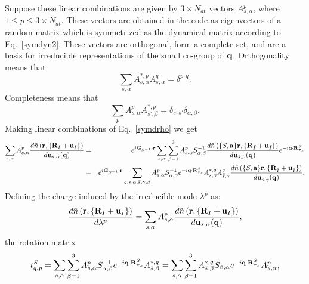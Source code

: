 \documentclass[12pt,a4paper,twoside]{report}
\begin{document}
Suppose these linear combinations are given by $3\times N_{at}$ vectors $A^{p}_{s,\alpha}$, where
$1\le p \le 3 \times N_{at}$. These vectors are obtained in the code as eigenvectors of a random matrix which is symmetrized as the dynamical matrix according to Eq.~\ref{symdyn2}. These vectors are orthogonal, form a complete set, and are a basis for irreducible representations of the small co-group of ${\bf q}$.
Orthogonality means that
\begin{equation}
\sum_{s,\alpha} A^{*,p}_{s,\alpha} A^{q}_{s,\alpha}=\delta^{p,q}.
\end{equation}
Completeness means that
\begin{equation}
\sum_{p} A^{p}_{s,\alpha} A^{*,p}_{s',\beta}=\delta_{s,s'} \delta_{\alpha,\beta}.
\end{equation}
Making linear combinations of Eq.~\ref{symdrho}
we get
\begin{eqnarray}
\sum_{s,\alpha} A^p_{s,\alpha} {d \tilde n\left({\bf r}, \{{\bf R}_I + {\bf u}_I\}\right)
\over d {\bf u}_{s,\alpha}({\bf q})} 
&=& e^{i{\bf G}_{S^{-1}} \cdot {\bf r}}
\sum_{s,\alpha}
\sum_{\beta=1}^3 A^p_{s,\alpha} S^{-1}_{\alpha,\beta} {d \tilde n\left(\{S,{\bf a}\} {\bf r}, \{{\bf R}_{\bar I} + {\bf u}_{\bar I}\}\right)
\over d {\bf u}_{\bar s,\beta} ({\bf q})} e^{-i{\bf q}\cdot {\bf R}^S_{{\boldsymbol{\tau}_s}}}\nonumber \\
&=& e^{i{\bf G}_{S^{-1}} \cdot {\bf r}}
\sum_{q,s,\alpha, \bar{\bar s},\gamma,\beta} A^p_{s,\alpha} S^{-1}_{\alpha,\beta} e^{-i{\bf q}\cdot {\bf R}^S_{{\boldsymbol{\tau}_s}}} A^{*,q}_{\bar s,\beta} A^q_{\bar {\bar s},\gamma} {d \tilde n\left(\{S,{\bf a}\} {\bf r}, \{{\bf R}_{\bar I} + {\bf u}_{\bar I}\}\right)
\over d {\bf u}_{\bar {\bar s},\gamma} ({\bf q})}. \nonumber \\
\label{symdrhop}
\end{eqnarray}
Defining the charge induced by the irreducible mode $\lambda^p$ as:
\begin{equation}
{d \tilde n\left({\bf r}, \{{\bf R}_I + {\bf u}_I\}\right)
\over d \lambda^p}=
\sum_{s,\alpha} A^p_{s,\alpha} {d \tilde n\left({\bf r}, \{{\bf R}_I + {\bf u}_I\}\right)
\over d {\bf u}_{s,\alpha}({\bf q})},
\end{equation}
the rotation matrix
\begin{equation}
t_{q,p}^S=
\sum_{s,\alpha}
\sum_{\beta=1}^3 A^p_{s,\alpha} S^{-1}_{\alpha,\beta} e^{-i{\bf q}\cdot {\bf R}^S_{{\boldsymbol{\tau}_s}}} A^{*,q}_{\bar s,\beta} = \sum_{s,\alpha}
\sum_{\beta=1}^3 A^{*,q}_{\bar s,\beta} S_{\beta,\alpha} e^{-i{\bf q}\cdot {\bf R}^S_{{\boldsymbol{\tau}_s}}} A^p_{s,\alpha},
\label{tnotr}
\end{equation}
\end{document}
